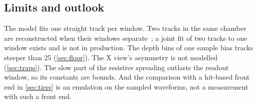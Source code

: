 \subsection{Limits and outlook}\label{sec:outlook}
The model fits one straight track per window. Two tracks in the same chamber are reconstructed when their windows separate~\cite{paperI}; a joint fit of two tracks to one window exists and is not in production.
The depth bins of one sample bias tracks steeper than 25\textdegree{} (\cref{sec:floor}). The X view's asymmetry is not
modelled (\cref{sec:traps}). The slow part of the resistive spreading outlasts the readout window, so its constants
are bounds. And the comparison with a hit-based front end in \cref{sec:tiers} is an emulation on the sampled
waveforms, not a measurement with such a front end.
